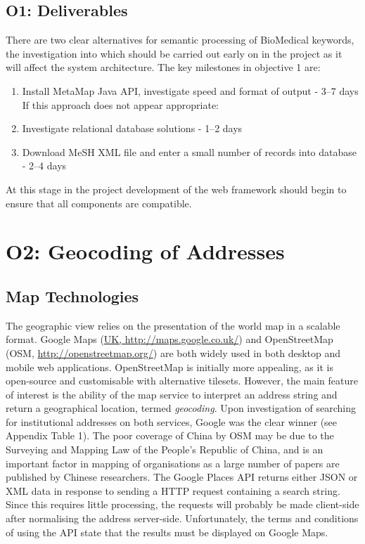 \documentclass[PROP_AGutteridge_CS.tex]{subfiles}
\begin{document}
\subsection{O1: Deliverables}
There are two clear alternatives for semantic processing of BioMedical keywords, the investigation into which should be carried out early on in the project as it will affect the system architecture. The key milestones in objective 1 are:
\begin{enumerate}
\item{Install MetaMap Java API, investigate speed and format of output - 3--7 days}
If this approach does not appear appropriate:
\item{Investigate relational database solutions - 1--2 days}
\item{Download MeSH XML file and enter a small number of records into database - 2--4 days}
\end{enumerate}

\noindent At this stage in the project development of the web framework should begin to ensure that all components are compatible. 

\section{O2: Geocoding of Addresses}
\subsection{Map Technologies}
The geographic view relies on the presentation of the world map in a scalable format. Google Maps (\url{UK, http://maps.google.co.uk/}) and OpenStreetMap (OSM, \url{http://openstreetmap.org/}) are both widely used in both desktop and mobile web applications. OpenStreetMap is initially more appealing, as it is open-source and customisable with alternative tilesets. However, the main feature of interest is the ability of the map service to interpret an address string and return a geographical location, termed \emph{geocoding}. Upon investigation of searching for institutional addresses on both services, Google was the clear winner (see Appendix Table 1). The poor coverage of China by OSM may be due to the Surveying and Mapping Law of the People's Republic of China\cite{maplaw}, and is an important factor in mapping of organisations as a large number of papers are published by Chinese researchers. The Google Places API returns either JSON or XML data in response to sending a HTTP request containing a search string. Since this requires little processing, the requests will probably be made client-side after normalising the address server-side. Unfortunately, the terms and conditions of using the API state that the results must be displayed on Google Maps.
\end{document}
